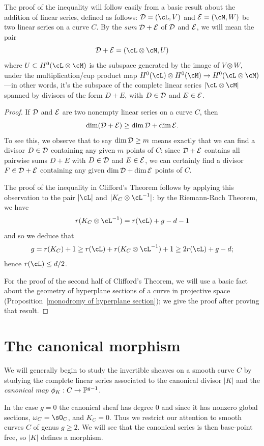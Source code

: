 The proof of the inequality will follow easily from a basic result about the addition of linear series, defined as follows:
$\cD = (\cL,V)$ and $\cE = (\cM, W)$ be two linear series on a curve $C$. By the \emph{sum} $\cD + \cE$ of $\cD$ and $\cE$, we will mean the pair 
$$
\cD + \cE = (\cL \otimes \cM, U) 
$$
where $U \subset H^0(\cL \otimes \cM)$ is the subspace generated by the image of $V \otimes W$, under the multiplication/cup product map $H^0(\cL) \otimes H^0(\cM) \to H^0(\cL \otimes \cM)$---in other words, it's the subspace of the complete linear series $|\cL\otimes \cM|$ spanned by divisors of the form $D+E$, with $D \in \cD$ and $E \in \cE$.
 
\begin{proof}
If $\cD$ and $\cE$ are two nonempty linear series on a curve $C$, then
$$
\dim(\cD + \cE) \geq \dim \cD + \dim \cE.
$$
To see this, we observe that to say $\dim \cD \geq m$ means exactly that we can find a divisor $D \in \cD$ containing any given $m$ points of $C$; since $\cD + \cE$ contains all pairwise sums $D + E$ with $D \in \cD$ and $E \in \cE$, we can certainly find a divisor $F \in \cD + \cE$ containing any given $\dim \cD + \dim \cE$ points of $C$.

The proof of the inequality in Clifford's Theorem follows  by applying this observation to the pair $|\cL|$ and $|K_C\otimes \cL^{-1}|$: by 
the Riemann-Roch Theorem, we have
$$
r(K_C\otimes \cL^{-1}) = r(\cL) +g - d - 1
$$
and so we deduce that
$$
g = r(K_C) + 1 \geq r(\cL) + r(K_C\otimes \cL^{-1}) + 1 \geq 2r(\cL) +g - d;
$$
hence $r(\cL) \leq d/2$.

For the proof of the second half of Clifford's Theorem, we will use a basic fact about the geometry of hyperplane sections of a curve in projective space (Proposition~\ref{monodromy of hyperplane section}); we give the proof after proving that result.
\end{proof}



\section{The canonical morphism}

We will generally begin to study the invertible sheaves on a smooth curve $C$ by studying the complete linear series associated to the canonical divisor $|K|$ and the \emph{canonical map}
 $\phi_K : C \to \PP^{g-1}$. 
 
 In the case $g=0$ the canonical sheaf has degree 0 and since it has nonzero global sections, 
 $\omega_C = \sO_C$, and $K_C = 0$. Thus we restrict our attention to smooth curves $C$ of genus $g\geq 2$. We will see
 that the canonical series is then base-point free, so $|K|$ defines a morphism.

